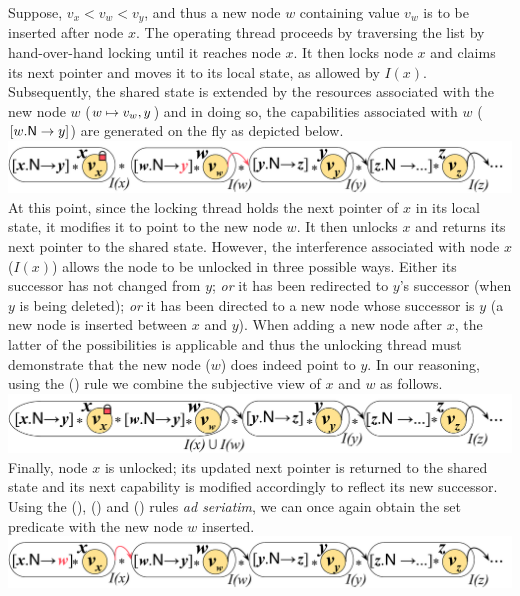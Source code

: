 Suppose, $v_x < v_w < v_y$, and thus a new node $w$ containing value $v_w$ is to be inserted after node $x$.  The operating thread proceeds by traversing the list by hand-over-hand locking until it reaches node $x$. It then locks node $x$ and claims its next pointer and moves it to its local state, as allowed by $I(x)$. Subsequently, the shared state is extended by the resources associated with the new node $w$ ($w \mapsto v_w, y$) and in doing so, the capabilities associated with $w$ ($\nextC{w}{y}$) are generated on the fly as depicted below.\\
%
\includegraphics[scale=0.215]{Sections/FurtherExamples/Images/add1.pdf}\\
%
At this point, since the locking thread holds the next pointer of $x$ in its local state, it modifies it to point to the new node $w$. It then unlocks $x$ and returns its next pointer to the shared state. However, the interference associated with node $x$ ($I(x)$) allows the node to be unlocked in three possible ways. Either its successor has not changed from $y$; \emph{or} it has been redirected to $y$'s successor (when $y$ is being deleted); \emph{or} it has been directed to a new node whose successor is $y$ (a new node is inserted between $x$ and $y$). When adding a new node after $x$, the latter of the possibilities is applicable and thus the unlocking thread must demonstrate that the new node ($w$) does indeed point to $y$. In our reasoning, using the (\mergeRule) rule we combine the subjective view of $x$ and $w$ as follows.\\
%
\includegraphics[scale=0.22]{Sections/FurtherExamples/Images/add2.pdf}\\
%
Finally, node $x$ is unlocked; its updated next pointer is returned to the shared state and its next capability is modified accordingly to reflect its new successor. Using the (\copyRule), (\forgetRule) and (\shiftRule) rules \textit{ad seriatim}, we can once again obtain the set predicate with the new node $w$ inserted. \\
%
\includegraphics[scale=0.215]{Sections/FurtherExamples/Images/add3.pdf}
%

